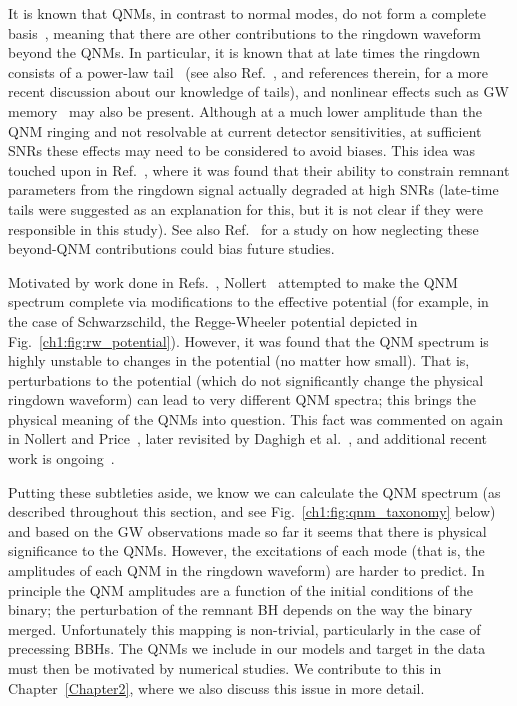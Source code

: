 It is known that QNMs, in contrast to normal modes, do not form a complete basis~\cite{Ching:1993gt, Ching:1995rt, Nollert:1998ys, Ching:1998mxl, Nollert:1999ji}, meaning that there are other contributions to the ringdown waveform beyond the QNMs.
In particular, it is known that at late times the ringdown consists of a power-law tail~\cite{Price:1971fb, Leaver:1986gd, Ching:1995tj} (see also Ref.~\cite{Gleiser:2007ti}, and references therein, for a more recent discussion about our knowledge of tails), and nonlinear effects such as GW memory~\cite{Favata:2010zu} may also be present.
Although at a much lower amplitude than the QNM ringing and not resolvable at current detector sensitivities, at sufficient SNRs these effects may need to be considered to avoid biases.
This idea was touched upon in Ref.~\cite{Thrane:2017lqn}, where it was found that their ability to constrain remnant parameters from the ringdown signal actually degraded at high SNRs (late-time tails were suggested as an explanation for this, but it is not clear if they were responsible in this study).
See also Ref.~\cite{Baibhav:2017jhs} for a study on how neglecting these beyond-QNM contributions could bias future studies.

Motivated by work done in Refs.~\cite{Ching:1993gt, Ching:1995rt}, Nollert~\cite{Nollert:1996rf} attempted to make the QNM spectrum complete via modifications to the effective potential (for example, in the case of Schwarzschild, the Regge-Wheeler potential depicted in Fig.~\ref{ch1:fig:rw_potential}).
However, it was found that the QNM spectrum is highly unstable to changes in the potential (no matter how small).
That is, perturbations to the potential (which do not significantly change the physical ringdown waveform) can lead to very different QNM spectra; this brings the physical meaning of the QNMs into question.
This fact was commented on again in Nollert and Price~\cite{Nollert:1998ys}, later revisited by Daghigh et al.~\cite{Daghigh:2020jyk}, and additional recent work is ongoing~\cite{Jaramillo:2020tuu, Qian:2020cnz, Jaramillo:2021tmt, Cheung:2021bol, Berti:2022xfj}.

Putting these subtleties aside, we know we can calculate the QNM spectrum (as described throughout this section, and see Fig.~\ref{ch1:fig:qnm_taxonomy} below) and based on the GW observations made so far it seems that there is physical significance to the QNMs.
However, the excitations of each mode (that is, the amplitudes of each QNM in the ringdown waveform) are harder to predict. 
In principle the QNM amplitudes are a function of the initial conditions of the binary; the perturbation of the remnant BH depends on the way the binary merged.
Unfortunately this mapping is non-trivial, particularly in the case of precessing BBHs.
The QNMs we include in our models and target in the data must then be motivated by numerical studies.
We contribute to this in Chapter~\ref{Chapter2}, where we also discuss this issue in more detail.

